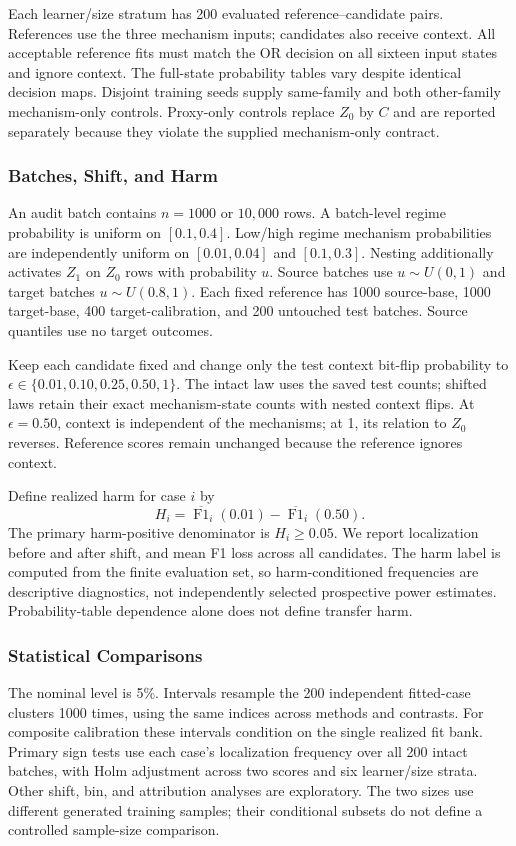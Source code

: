 \documentclass[conference]{IEEEtran}
\begin{document}
Each learner/size stratum has 200 evaluated reference--candidate pairs. References use the three mechanism inputs; candidates also receive context. All acceptable reference fits must match the OR decision on all sixteen input states and ignore context. The full-state probability tables vary despite identical decision maps. Disjoint training seeds supply same-family and both other-family mechanism-only controls. Proxy-only controls replace $Z_0$ by $C$ and are reported separately because they violate the supplied mechanism-only contract.

\subsubsection{Batches, Shift, and Harm}
An audit batch contains $n=1000$ or $10{,}000$ rows. A batch-level regime probability is uniform on $[0.1,0.4]$. Low/high regime mechanism probabilities are independently uniform on $[0.01,0.04]$ and $[0.1,0.3]$. Nesting additionally activates $Z_1$ on $Z_0$ rows with probability $u$. Source batches use $u\sim U(0,1)$ and target batches $u\sim U(0.8,1)$. Each fixed reference has 1000 source-base, 1000 target-base, 400 target-calibration, and 200 untouched test batches. Source quantiles use no target outcomes.

Keep each candidate fixed and change only the test context bit-flip probability to $\epsilon\in\{0.01,0.10,0.25,0.50,1\}$. The intact law uses the saved test counts; shifted laws retain their exact mechanism-state counts with nested context flips. At $\epsilon=0.50$, context is independent of the mechanisms; at 1, its relation to $Z_0$ reverses. Reference scores remain unchanged because the reference ignores context.

Define realized harm for case $i$ by
\begin{equation}
 H_i=\overline{\operatorname{F1}}_i(0.01)-\overline{\operatorname{F1}}_i(0.50).
\end{equation}
The primary harm-positive denominator is $H_i\geq0.05$. We report localization before and after shift, and mean F1 loss across all candidates. The harm label is computed from the finite evaluation set, so harm-conditioned frequencies are descriptive diagnostics, not independently selected prospective power estimates. Probability-table dependence alone does not define transfer harm.

\subsubsection{Statistical Comparisons}
The nominal level is 5\%. Intervals resample the 200 independent fitted-case clusters 1000 times, using the same indices across methods and contrasts. For composite calibration these intervals condition on the single realized fit bank. Primary sign tests use each case's localization frequency over all 200 intact batches, with Holm adjustment across two scores and six learner/size strata. Other shift, bin, and attribution analyses are exploratory. The two sizes use different generated training samples; their conditional subsets do not define a controlled sample-size comparison.
\end{document}
